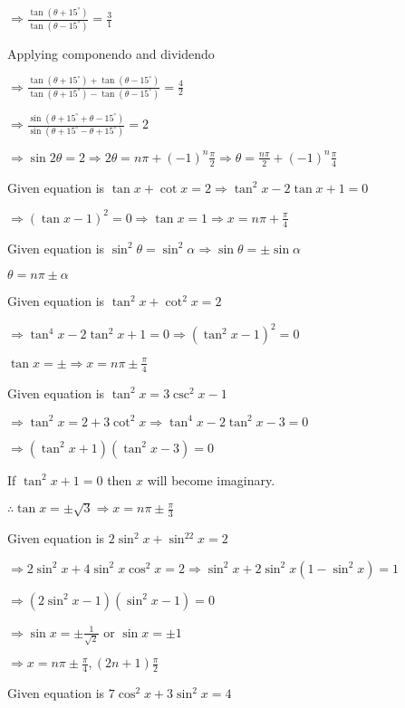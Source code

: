   $\Rightarrow \frac{\tan(\theta + 15^\circ)}{\tan(\theta - 15^\circ)} = \frac{3}{1}$

  Applying componendo and dividendo

  $\Rightarrow \frac{\tan(\theta + 15^\circ) + \tan(\theta - 15^\circ)}{\tan(\theta + 15^\circ) - \tan(\theta - 15^\circ)}
  = \frac{4}{2}$

  $\Rightarrow \frac{\sin(\theta + 15^\circ + \theta - 15^\circ)}{\sin(\theta + 15^\circ - \theta + 15^\circ)} = 2$

  $\Rightarrow \sin2\theta = 2 \Rightarrow 2\theta = n\pi + (-1)^n\frac{\pi}{2} \Rightarrow \theta = \frac{n\pi}{2} +
  (-1)^n\frac{\pi}{4}$
\item Given equation is $\tan x + \cot x = 2 \Rightarrow \tan^2x - 2\tan x + 1 = 0$

  $\Rightarrow (\tan x - 1)^2 = 0 \Rightarrow \tan x = 1 \Rightarrow x = n\pi + \frac{\pi}{4}$
\item Given equation is $\sin^2\theta = \sin^2\alpha \Rightarrow \sin\theta = \pm \sin\alpha$

  $\theta = n\pi \pm\alpha$
\item Given equation is $\tan^2x + \cot^2x = 2$

  $\Rightarrow \tan^4x - 2\tan^2x + 1 = 0 \Rightarrow (\tan^2x - 1)^2 = 0$

  $\tan x = \pm \Rightarrow x = n\pi \pm \frac{\pi}{4}$
\item Given equation is $\tan^2x = 3\csc^2x - 1$

  $\Rightarrow \tan^2x = 2 + 3\cot^2x \Rightarrow \tan^4x -2\tan^2x - 3 = 0$

  $\Rightarrow (\tan^2x + 1)(\tan^2x - 3) = 0$

  If $\tan^2x + 1 = 0$ then $x$ will become imaginary.

  $\therefore \tan x = \pm\sqrt{3} \Rightarrow x = n\pi \pm \frac{\pi}{3}$
\item Given equation is $2\sin^2x + \sin^22x = 2$

  $\Rightarrow 2\sin^2x + 4\sin^2x\cos^2x = 2 \Rightarrow \sin^2x + 2\sin^2x(1 - \sin^2x) = 1$

  $\Rightarrow (2\sin^2x - 1)(\sin^2x - 1) = 0$

  $\Rightarrow \sin x = \pm\frac{1}{\sqrt{2}}$ or $\sin x = \pm 1$

  $\Rightarrow x = n\pi \pm \frac{\pi}{4}, (2n + 1)\frac{\pi}{2}$
\item Given equation is $7\cos^2 x + 3\sin^2 x = 4$


